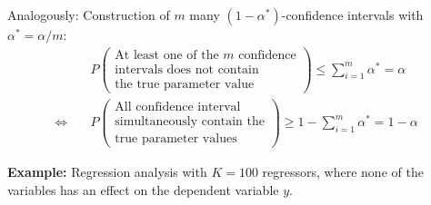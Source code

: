 \documentclass[]{book}
\theoremstyle{definition}
\theoremstyle{definition}
\theoremstyle{definition}
\theoremstyle{remark}
\begin{document}
Analogously: Construction of \(m\) many \((1-\alpha^*)\)-confidence intervals with \(\alpha^* =\alpha/m\):
\begin{align*}
&P\begin{pmatrix}
      \text{At least one of the $m$ confidence} \\
      \text{intervals does not contain} \\
      \text{the true parameter value} 
  \end{pmatrix}
\leq \sum_{i=1}^m \alpha^\ast = \alpha\\[2ex]
\Leftrightarrow\quad
&P\begin{pmatrix}
    \text{All confidence interval} \\
    \text{simultaneously contain the} \\
    \text{true parameter values}
  \end{pmatrix}
\geq 1 - \sum_{i=1}^m \alpha^\ast = 1 - \alpha
\end{align*}

\textbf{Example:}
Regression analysis with \(K=100\) regressors, where none of the variables has an effect on the dependent variable \(y\).
\end{document}
